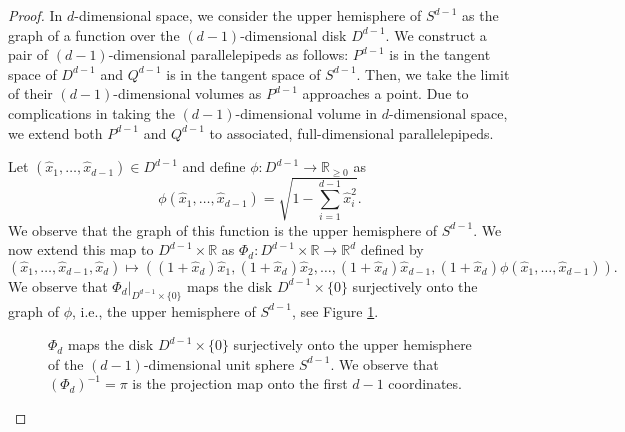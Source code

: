 \documentclass[twoside,11pt]{article}
\newcommand{\R}{{\mathbb R}}
\begin{document}
\begin{proof}
In $d$-dimensional space, we consider the upper hemisphere of $S^{d-1}$ as the graph of a function over the $(d-1)$-dimensional disk $D^{d-1}$.
We  construct a pair of $(d-1)$-dimensional parallelepipeds as follows: $P^{d-1}$ is in the tangent space of $D^{d-1}$ and $Q^{d-1}$ is in the tangent space of $S^{d-1}$.  Then, we take the limit of their $(d-1)$-dimensional volumes as $P^{d-1}$ approaches a point.  
			Due to complications in taking the $(d-1)$-dimensional volume in $d$-dimensional space, we extend both $P^{d-1}$ and $Q^{d-1}$ to associated, full-dimensional parallelepipeds.
			
			Let $(\hat{x}_1,\dots,\hat{x}_{d-1})\in D^{d-1}$ and define $\phi: D^{d-1} \rightarrow \R_{\geq 0}$ as 
			\[\phi(\hat{x}_1, \ldots, \hat{x}_{d-1}) = \sqrt{1-\sum_{i=1}^{d-1} \hat{x}_i^2}.\]
			We observe that the graph of this function is the upper hemisphere of $S^{d-1}$.  
			We now extend this map to $D^{d-1}\times\mathbb{R}$ as $\Phi_d: D^{d-1} \times \R \rightarrow \R^d$ defined by
				\[(\hat{x}_1, \ldots, \hat{x}_{d-1}, \hat{x}_d) \mapsto \left( (1+\hat{x}_d)\hat{x}_1, (1+\hat{x}_d)\hat{x}_2, \ldots, (1+\hat{x}_d)\hat{x}_{d-1}, (1+\hat{x}_d)\phi(\hat{x}_1, \ldots, \hat{x}_{d-1}) \right).\]  
				We observe that $\Phi_d|_{D^{d-1}\times\{0\}}$ maps the disk $D^{d-1}\times\{0\}$ surjectively onto the graph of $\phi$, i.e., the upper hemisphere of $S^{d-1}$, see Figure 
			\ref{Figure: MapPhi}.
			
				\begin{figure}[bt]
				\begin{center}
				\end{center}
				\caption{$\Phi_d$ maps the disk $D^{d-1}\times\{0\}$ surjectively onto the upper hemisphere of the $(d-1)$-dimensional unit sphere $S^{d-1}$. 
				We observe 
				that $(\Phi_d)^{-1} = \pi$ is the projection map onto the first $d-1$ coordinates.
				 \label{Figure: MapPhi}}
				\end{figure}
								

\end{proof}
\end{document}
